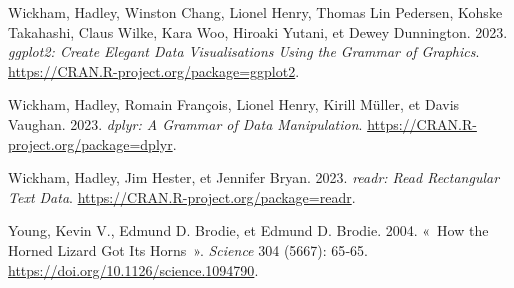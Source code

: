 \documentclass[
  a4paper,
  DIV=11,
  numbers=noendperiod,
  oneside]{scrreprt}
\newlength{\cslhangindent}
\newlength{\cslentryspacingunit} %
\newenvironment{CSLReferences}[2] %
 {%
  \setlength{\parindent}{0pt}
  \ifodd #1
  \let\oldpar\par
  \def\par{\hangindent=\cslhangindent\oldpar}
  \fi
  \setlength{\parskip}{#2\cslentryspacingunit}
 }%
 {}
\begin{document}
\begin{CSLReferences}{1}{0}
\leavevmode{}%
Wickham, Hadley, Winston Chang, Lionel Henry, Thomas Lin Pedersen,
Kohske Takahashi, Claus Wilke, Kara Woo, Hiroaki Yutani, et Dewey
Dunnington. 2023. \emph{ggplot2: Create Elegant Data Visualisations
Using the Grammar of Graphics}.
\url{https://CRAN.R-project.org/package=ggplot2}.

\leavevmode{}%
Wickham, Hadley, Romain François, Lionel Henry, Kirill Müller, et Davis
Vaughan. 2023. \emph{dplyr: A Grammar of Data Manipulation}.
\url{https://CRAN.R-project.org/package=dplyr}.

\leavevmode{}%
Wickham, Hadley, Jim Hester, et Jennifer Bryan. 2023. \emph{readr: Read
Rectangular Text Data}. \url{https://CRAN.R-project.org/package=readr}.

\leavevmode{}%
Young, Kevin V., Edmund D. Brodie, et Edmund D. Brodie. 2004. {«~How the
Horned Lizard Got Its Horns~»}. \emph{Science} 304 (5667): 65‑65.
\url{https://doi.org/10.1126/science.1094790}.

\end{CSLReferences}
\end{document}
